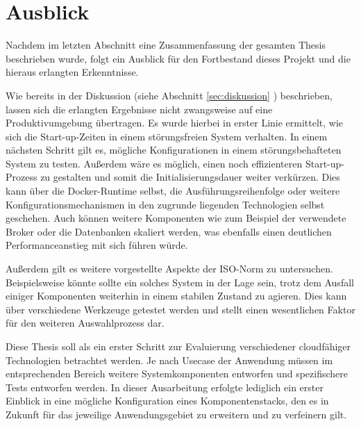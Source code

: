 \chapter{Ausblick}

Nachdem im letzten Abschnitt eine Zusammenfassung der gesamten Thesis beschrieben wurde, folgt ein Ausblick für den Fortbestand dieses Projekt und die hieraus erlangten Erkenntnisse.

Wie bereits in der Diskussion (siehe Abschnitt \ref{sec:diskussion} ) beschrieben, lassen sich die erlangten Ergebnisse nicht zwangsweise auf eine Produktivumgebung übertragen. Es wurde hierbei in erster Linie ermittelt, wie sich die Start-up-Zeiten in einem störungsfreien System verhalten. In einem nächsten Schritt gilt es, mögliche Konfigurationen in einem störungsbehafteten System zu testen. Außerdem wäre es möglich, einen noch effizienteren Start-up-Prozess zu gestalten und somit die Initialisierungsdauer weiter verkürzen. Dies kann über die Docker-Runtime selbst, die Ausführungsreihenfolge oder weitere Konfigurationsmechanismen in den zugrunde liegenden Technologien selbst geschehen. Auch können weitere Komponenten wie zum Beispiel der verwendete Broker oder die Datenbanken skaliert werden, was ebenfalls einen deutlichen Performanceanstieg mit sich führen würde.

Außerdem gilt es weitere vorgestellte Aspekte der ISO-Norm zu untersuchen. Beispielsweise könnte sollte ein solches System in der Lage sein, trotz dem Ausfall einiger Komponenten weiterhin in einem stabilen Zustand zu agieren. Dies kann über verschiedene Werkzeuge getestet werden und stellt einen wesentlichen Faktor für den weiteren Auswahlprozess dar. 

Diese Thesis soll als ein erster Schritt zur Evaluierung verschiedener cloudfähiger Technologien betrachtet werden. Je nach Usecase der Anwendung müssen im entsprechenden Bereich weitere Systemkomponenten entworfen und spezifischere Tests entworfen werden. In dieser Ausarbeitung erfolgte lediglich ein erster Einblick in eine mögliche Konfiguration eines Komponentenstacks, den es in Zukunft für das jeweilige Anwendungsgebiet zu erweitern und zu verfeinern gilt.
